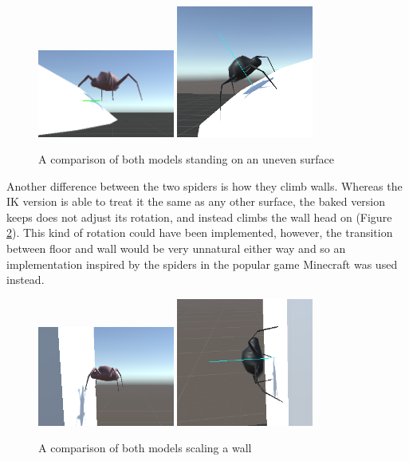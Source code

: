 \begin{figure}[h!]
    \centering
    \captionsetup{justification=centering}
    \includegraphics[width=0.4\textwidth]{grafika/sp_b_round.png}
    \includegraphics[width=0.4\textwidth]{grafika/sp_ik_round.png}
    \caption{A comparison of both models standing on an uneven surface}
    \label{fig:sp_round}
\end{figure}

Another difference between the two spiders is how they climb walls. Whereas the
IK version is able to treat it the same as any other surface, the baked version
keeps does not adjust its rotation, and instead climbs the wall head on (Figure
\ref{fig:sp_wall}). This kind of rotation could have been implemented, however,
the transition between floor and wall would be very unnatural either way and so
an implementation inspired by the spiders in the popular game Minecraft was used
instead.

\begin{figure}[h!]
    \centering
    \captionsetup{justification=centering}
    \includegraphics[width=0.4\textwidth]{grafika/sp_b_wall.png}
    \includegraphics[width=0.4\textwidth]{grafika/sp_ik_wall.png}
    \caption{A comparison of both models scaling a wall}
    \label{fig:sp_wall}
\end{figure}

